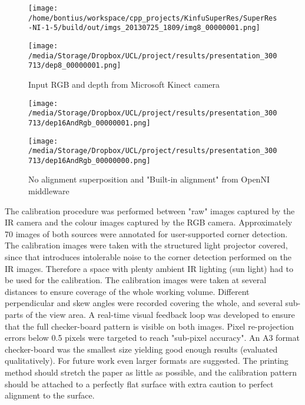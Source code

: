 \documentclass{ucl_thesis}
\begin{document}
\begin{figure}[h!]\centering
    \begin{minipage}[b]{0.49\linewidth}
        \texttt{[image: /home/bontius/workspace/cpp\_projects/KinfuSuperRes/SuperRes-NI-1-5/build/out/imgs\_20130725\_1809/img8\_00000001.png]}
    \end{minipage}
    \begin{minipage}[b]{0.49\linewidth}
        \texttt{[image: /media/Storage/Dropbox/UCL/project/results/presentation\_300713/dep8\_00000001.png]}
    \end{minipage}
    \caption{Input RGB and depth from Microsoft Kinect camera}
    \label{fig:input}
\end{figure}

\begin{figure}[h!]\centering
	\begin{minipage}[b]{0.49\linewidth}
		\texttt{[image: /media/Storage/Dropbox/UCL/project/results/presentation\_300713/dep16AndRgb\_00000001.png]}
	\end{minipage}
	\begin{minipage}[b]{0.49\linewidth}
		\texttt{[image: /media/Storage/Dropbox/UCL/project/results/presentation\_300713/dep16AndRgb\_00000000.png]}
	\end{minipage}
	\caption{No alignment superposition and "Built-in alignment" from OpenNI middleware}
	\label{fig:calib_built_in}
\end{figure}

\par The calibration procedure was performed between "raw" images captured by the IR camera and the colour images captured by the RGB camera. Approximately 70 images of both sources were annotated for user-supported corner detection. The calibration images were taken with the structured light projector covered, since that introduces intolerable noise to the corner detection performed on the IR images. Therefore a space with plenty ambient IR lighting (sun light) had to be used for the calibration. The calibration images were taken at several distances to ensure coverage of the whole working volume. Different perpendicular and skew angles were recorded covering the whole, and several sub-parts of the view area. A real-time visual feedback loop was developed to ensure that the full checker-board pattern is visible on both images. Pixel re-projection errors below 0.5 pixels were targeted to reach "sub-pixel accuracy". An A3 format checker-board was the smallest size yielding good enough results (evaluated qualitatively). For future work even larger formats are suggested. The printing method should stretch the paper as little as possible, and the calibration pattern should be attached to a perfectly flat surface with extra caution to  perfect alignment to the surface.
\end{document}
